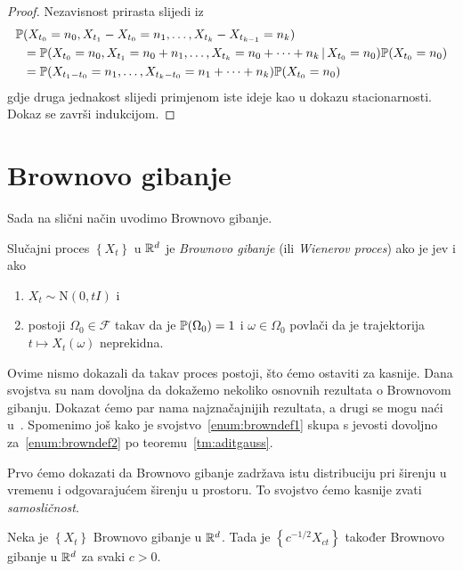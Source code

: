 \documentclass[main.tex]{subfiles}
\begin{document}
\begin{proof}
	Nezavisnost prirasta slijedi iz
	\begin{equation}
		\begin{aligned}
			\P & (X_{t_0}=n_0, X_{t_1}- X_{t_0} = n_1, \ldots, X_{t_k}-X_{t_{k-1}} = n_k)                                \\
			   & =\P(X_{t_0} = n_0, X_{t_1}=n_0+n_1, \ldots, X_{t_k} = n_0+\cdots+n_k \given X_{t_0}=n_0)\P(X_{t_0}=n_0) \\
			   & =\P(X_{t_1-t_0}=n_1,\ldots,X_{t_k-t_0}=n_1+\cdots+n_k)\P(X_{t_0}=n_0)
		\end{aligned}
	\end{equation}
	gdje druga jednakost slijedi primjenom iste ideje kao u dokazu stacionarnosti. Dokaz se završi indukcijom.
\end{proof}

\section{Brownovo gibanje}\label{sec:sp-brown}
Sada na slični način uvodimo Brownovo gibanje.

\begin{definicija} \label{def:brown}
	Slučajni proces \( \left\{ X_t \right\} \) u \( \R^d \) je \emph{Brownovo gibanje} (ili \emph{Wienerov proces}) ako je \levy jev i ako
	\begin{enumerate}[label=(\roman*)]
		\item \( X_t \sim \mathrm N(0, tI) \) i \label{enum:browndef1}
		\item postoji \( \Omega_0 \in \mathcal F \) takav da je \( \P(\Omega_0)=1 \) i \( \omega \in \Omega_0 \) povlači da je trajektorija \( t \mapsto X_t(\omega) \) neprekidna. \label{enum:browndef2}
	\end{enumerate}
\end{definicija}

Ovime nismo dokazali da takav proces postoji, što ćemo ostaviti za kasnije. Dana svojstva su nam dovoljna da dokažemo nekoliko osnovnih rezultata
o Brownovom gibanju. Dokazat ćemo par nama najznačajnijih rezultata, a drugi se mogu naći u~\cite[]{sato}. Spomenimo još kako je svojstvo~\ref{enum:browndef1}
skupa s \levy jevosti dovoljno za~\ref{enum:browndef2} po teoremu~\ref{tm:aditgauss}.

Prvo ćemo dokazati da Brownovo gibanje zadržava istu distribuciju pri širenju u vremenu i odgovarajućem širenju u prostoru. To svojstvo ćemo kasnije zvati
\emph{samosličnost}.

\begin{teorem} \label{tm:brown-samoslicnost}
	Neka je \( \left\{ X_t \right\} \) Brownovo gibanje u \( \R^d \). Tada je \( \left\{ c^{-1/2}X_{ct} \right\} \) također Brownovo gibanje
	u \( \R^d \) za svaki \( c > 0 \).
\end{teorem}
\end{document}
